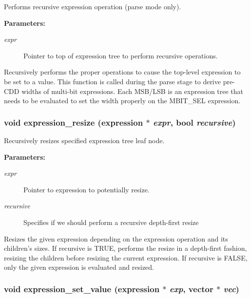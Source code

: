 Performs recursive expression operation (parse mode only).

\begin{Desc}
\item[{\bf Parameters: }]\par
\begin{description}
\item[
{\em expr}]Pointer to top of expression tree to perform recursive operations.

\end{description}
\end{Desc}
Recursively performs the proper operations to cause the top-level expression to be set to a value. This function is called during the parse stage to derive  pre-CDD widths of multi-bit expressions. Each MSB/LSB is an expression tree that  needs to be evaluated to set the width properly on the MBIT\_\-SEL expression. 
\subsubsection{\setlength{\rightskip}{0pt plus 5cm}void expression\_\-resize ({\bf expression} $\ast$ {\em expr}, {\bf bool} {\em recursive})}\label{expr_8c_a13}


Recursively resizes specified expression tree leaf node.

\begin{Desc}
\item[{\bf Parameters: }]\par
\begin{description}
\item[
{\em expr}]Pointer to expression to potentially resize. \item[
{\em recursive}]Specifies if we should perform a recursive depth-first resize

\end{description}
\end{Desc}
Resizes the given expression depending on the expression operation and its children's sizes. If recursive is TRUE, performs the resize in a depth-first fashion, resizing the children before resizing the current expression. If recursive is FALSE, only the given expression is evaluated and resized. 
\subsubsection{\setlength{\rightskip}{0pt plus 5cm}void expression\_\-set\_\-value ({\bf expression} $\ast$ {\em exp}, {\bf vector} $\ast$ {\em vec})}\label{expr_8c_a12}


